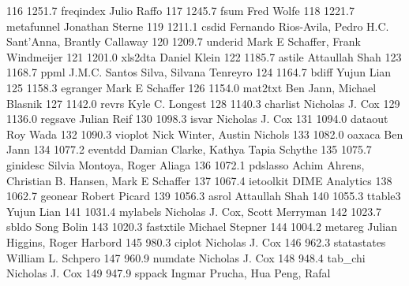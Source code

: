    116   1251.7    freqindex     Julio Raffo                             
   117   1245.7    fsum          Fred Wolfe                              
   118   1221.7    metafunnel    Jonathan Sterne                         
   119   1211.1    csdid         Fernando Rios-Avila, Pedro H.C.         
                                   Sant'Anna, Brantly Callaway             
   120   1209.7    underid       Mark E Schaffer, Frank Windmeijer       
   121   1201.0    xls2dta       Daniel Klein                            
   122   1185.7    astile        Attaullah Shah                          
   123   1168.7    ppml          J.M.C. Santos Silva, Silvana Tenreyro   
   124   1164.7    bdiff         Yujun Lian                              
   125   1158.3    egranger      Mark E Schaffer                         
   126   1154.0    mat2txt       Ben Jann, Michael Blasnik               
   127   1142.0    revrs         Kyle C. Longest                         
   128   1140.3    charlist      Nicholas J. Cox                         
   129   1136.0    regsave       Julian Reif                             
   130   1098.3    isvar         Nicholas J. Cox                         
   131   1094.0    dataout       Roy Wada                                
   132   1090.3    vioplot       Nick Winter, Austin Nichols             
   133   1082.0    oaxaca        Ben Jann                                
   134   1077.2    eventdd       Damian Clarke, Kathya Tapia Schythe     
   135   1075.7    ginidesc      Silvia Montoya, Roger Aliaga            
   136   1072.1    pdslasso      Achim Ahrens, Christian B. Hansen, Mark 
                                   E Schaffer                              
   137   1067.4    ietoolkit     DIME Analytics                          
   138   1062.7    geonear       Robert Picard                           
   139   1056.3    asrol         Attaullah Shah                          
   140   1055.3    ttable3       Yujun Lian                              
   141   1031.4    mylabels      Nicholas J. Cox, Scott Merryman         
   142   1023.7    sbldo         Song Bolin                              
   143   1020.3    fastxtile     Michael Stepner                         
   144   1004.2    metareg       Julian Higgins, Roger Harbord           
   145    980.3    ciplot        Nicholas J. Cox                         
   146    962.3    statastates   William L. Schpero                      
   147    960.9    numdate       Nicholas J. Cox                         
   148    948.4    tab_chi       Nicholas J. Cox                         
   149    947.9    sppack        Ingmar Prucha, Hua Peng, Rafal          
